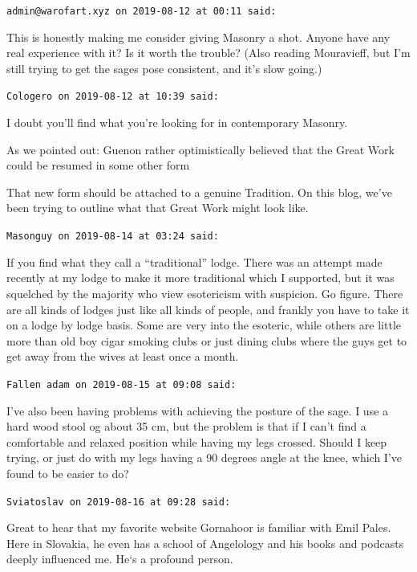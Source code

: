 \begin{footnotesize}
\begin{sffamily}
\texttt{admin@warofart.xyz on 2019-08-12 at 00:11 said:}

This is honestly making me consider giving Masonry a shot. Anyone have any real experience with it? Is it worth the trouble? (Also reading Mouravieff, but I'm still trying to get the sages pose consistent, and it's slow going.)

\hfill

\texttt{Cologero on 2019-08-12 at 10:39 said:}

I doubt you'll find what you're looking for in contemporary Masonry.

As we pointed out: Guenon rather optimistically believed that the Great Work could be resumed in some other form

That new form should be attached to a genuine Tradition. On this blog, we've been trying to outline what that Great Work might look like.

\hfill

\texttt{Masonguy on 2019-08-14 at 03:24 said:}

If you find what they call a ``traditional'' lodge. There was an attempt made recently at my lodge to make it more traditional which I supported, but it was squelched by the majority who view esotericism with suspicion. Go figure. There are all kinds of lodges just like all kinds of people, and frankly you have to take it on a lodge by lodge basis. Some are very into the esoteric, while others are little more than old boy cigar smoking clubs or just dining clubs where the guys get to get away from the wives at least once a month.

\hfill

\texttt{Fallen adam on 2019-08-15 at 09:08 said:}

I've also been having problems with achieving the posture of the sage. I use a hard wood stool og about 35 cm, but the problem is that if I can't find a comfortable and relaxed position while having my legs crossed. Should I keep trying, or just do with my legs having a 90 degrees angle at the knee, which I've found to be easier to do?

\hfill

\texttt{Sviatoslav on 2019-08-16 at 09:28 said:}

Great to hear that my favorite website Gornahoor is familiar with Emil Pales. Here in Slovakia, he even has a school of Angelology and his books and podcasts deeply influenced me. He`s a profound person.


\end{sffamily}
\end{footnotesize}
